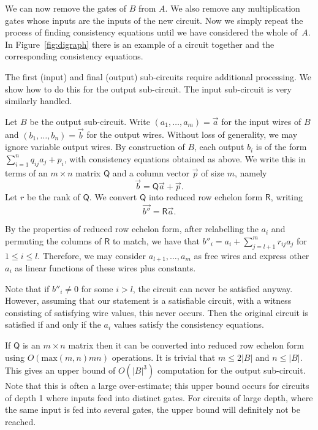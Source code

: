 We can now remove the gates of $B$ from $A$. We also remove any multiplication gates whose inputs are the inputs of the new circuit. Now we simply repeat the process of finding consistency equations until we have considered the whole of~$A$. In Figure~\ref{fig:digraph} there is an example of a circuit together and the corresponding consistency equations.



The first (input) and final (output) sub-circuits require additional processing. We show how to do this for the output sub-circuit. The input sub-circuit is very similarly handled.

Let $B$ be the output sub-circuit. Write $(a_1,\ldots,a_m)=\vec{a}$ for the input wires of $B$ and $(b_1,\ldots,b_n)=\vec{b}$ for the output wires. Without loss of generality, we may ignore variable output wires. By construction of $B$, each output $b_i$ is of the form $\sum_{i=1}^n q_{ij}a_j+p_i$, with consistency equations obtained as above. We write this in terms of an $m\times n$ matrix $\mathsf{Q}$ and a column vector $\vec{p}$ of size $m$, namely
$$\vec{b} = \mathsf{Q} \vec{a}+ \vec{p}.$$
%
Let $r$ be the rank of $\mathsf{Q}$. We convert $\mathsf{Q}$ into reduced row echelon form $\mathsf{R}$, writing
$$\vec{b''}=\mathsf{R}\vec{a}.$$

By the properties of reduced row echelon form, after relabelling the $a_i$ and permuting the columns of $\mathsf{R}$ to match, we have that $b''_i=a_i + \sum_{j=l+1}^m r_{ij} a_j$ for $1\leq i\leq l$. Therefore, we may consider $a_{l+1},\ldots,a_m$ as free wires and express other $a_i$ as linear functions of these wires plus constants.

Note that if $b''_i\neq 0$ for some $i>l$, the circuit can never be satisfied anyway. However, assuming that our statement is a satisfiable circuit, with a witness consisting of satisfying wire values, this never occurs. Then the original circuit is satisfied if and only if the $a_i$ values satisfy the consistency equations.

If $\mathsf{Q}$ is an $m\times n$ matrix then it can be converted into reduced row echelon form using $O(\mathrm{max}(m,n) mn)$ operations. It is trivial that $m\leq 2\left| B \right|$ and $n\leq \left| B \right|$. This gives an upper bound of $O(\left| B \right|^3)$ computation for the output sub-circuit. 
%
Note that this is often a large over-estimate; this upper bound occurs for circuits of depth 1 where inputs feed into distinct gates. For circuits of large depth, where the same input is fed into several gates, the upper bound will definitely not be reached. %

